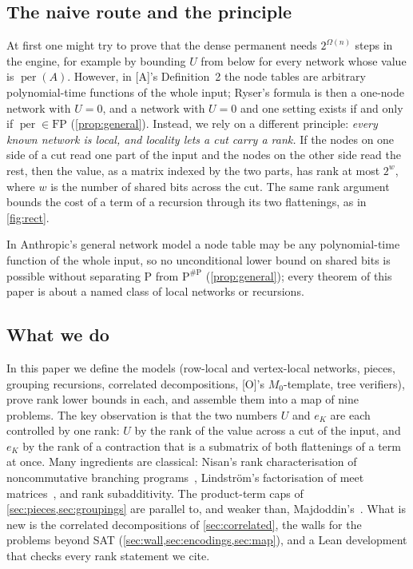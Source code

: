 \documentclass[10pt]{amsart}
\theoremstyle{plain}
\theoremstyle{definition}
\theoremstyle{remark}
\numberwithin{equation}{section}
\newcommand{\A}{\textup{[A]}}
\newcommand{\Oa}{\textup{[O]}}
\newcommand{\per}{\operatorname{per}}
\begin{document}
\subsection{The naive route and the principle}
At first one might try to prove that the dense permanent needs $2^{\Omega(n)}$ steps in the engine,
for example by bounding $U$ from below for every network whose value is $\per(A)$. However, in \A's
Definition~2 the node tables are arbitrary polynomial-time functions of the whole input; Ryser's
formula is then a one-node network with $U=0$, and a network with $U=0$ and one setting exists if and
only if $\per\in\mathrm{FP}$ (\cref{prop:general}). Instead, we rely on a different principle:
\emph{every known network is local, and locality lets a cut carry a rank.} If the nodes on one side
of a cut read one part of the input and the nodes on the other side read the rest, then the value,
as a matrix indexed by the two parts, has rank at most $2^w$, where $w$ is the number of shared bits
across the cut. The same rank argument bounds the cost of a term of a recursion through its two
flattenings, as in \cref{fig:rect}.

In Anthropic's general network model a node table may be any polynomial-time function of the whole
input, so no unconditional lower bound on shared bits is possible without separating $\mathrm P$
from $\mathrm P^{\#\mathrm P}$ (\cref{prop:general}); every theorem of this paper is about a named
class of local networks or recursions.

\subsection{What we do}
In this paper we define the models (row-local and vertex-local networks, pieces, grouping
recursions, correlated decompositions, \Oa's $M_0$-template, tree verifiers), prove rank lower bounds
in each, and assemble them into a map of nine problems. The key observation is that the two numbers
$U$ and $e_K$ are each controlled by one rank: $U$ by the rank of the value across a cut of the
input, and $e_K$ by the rank of a contraction that is a submatrix of both flattenings of a term at
once. Many ingredients are classical: Nisan's rank characterisation of noncommutative branching
programs~\cite{Nisan91}, Lindstr\"om's factorisation of meet matrices~\cite{Lindstrom69}, and rank
subadditivity. The product-term caps of \cref{sec:pieces,sec:groupings} are parallel to, and weaker
than, Majdoddin's~\cite{Maj26}. What is new is the correlated decompositions of
\cref{sec:correlated}, the walls for the problems beyond SAT (\cref{sec:wall,sec:encodings,sec:map}),
and a Lean development that checks every rank statement we cite.
\end{document}

